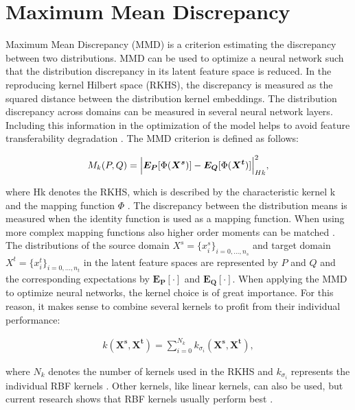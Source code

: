 \section{Maximum Mean Discrepancy}
Maximum Mean Discrepancy (MMD) is a criterion estimating the discrepancy between two distributions. MMD can be used to optimize a neural network such that the distribution discrepancy in its latent feature space is reduced. In the reproducing kernel Hilbert space (RKHS), the discrepancy is measured as the squared distance between the distribution kernel embeddings. The distribution discrepancy across domains can be measured in several neural network layers. Including this information in the optimization of the model helps to avoid feature transferability degradation \cite{li2020}. The MMD criterion is defined as follows:

\begin{align}
    M_{k}(P,Q) = \Bigl|  \boldsymbol{E_{P}}[\Phi(\boldsymbol{X^{s}})] - \boldsymbol{E_{Q}}[\Phi(\boldsymbol{X^{t}})]     \Bigl|^{2}_{Hk},
\end{align}

where Hk denotes the RKHS, which is described by the characteristic kernel k and the mapping function $\Phi$ \cite{AZAMFAR2020103932}. The discrepancy between the distribution means is measured when the identity function is used as a mapping function. When using more complex mapping functions also higher order moments can be matched \cite{Yujia2015}. The distributions of the source domain $X^{s} = \{{x}_{i}^{s}\}_{i=0,...,n_{s}}$ and target domain $X^{t} = \{{x}_{i}^{t}\}_{i=0,...,n_{t}}$ in the latent feature spaces are represented by $P$ and $Q$ and the corresponding expectations by $\boldsymbol{E_{P}[\cdot]}$ and $\boldsymbol{E_{Q}[\cdot]}$. When applying the MMD to optimize neural networks, the kernel choice is of great importance. For this reason, it makes sense to combine several kernels to profit from their individual performance:

\begin{align}
    k(\boldsymbol{X^{s}}, \boldsymbol{X^{t}}) = \sum_{i=0}^{N_{k}} k_{\sigma_{i}}(\boldsymbol{X^{s}}, \boldsymbol{X^{t}}),
\end{align}

where $N_{k}$ denotes the number of kernels used in the RKHS and $k_{\sigma_{i}}$ represents the individual RBF kernels  \cite{li2020}. Other kernels, like linear kernels, can also be used, but current research shows that RBF kernels usually perform best \cite{AZAMFAR2020103932}.


